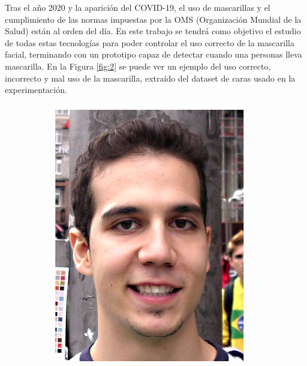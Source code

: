 Tras el año 2020 y la aparición del COVID-19, el uso de mascarillas y el cumplimiento de las normas impuestas por la OMS (Organización Mundial de la Salud) están al orden del día. En este trabajo se tendrá como objetivo el estudio de todas estas tecnologías para poder controlar el uso correcto de la mascarilla facial, terminando con un prototipo capaz de detectar cuando una personas lleva mascarilla. En la Figura \ref{fig:2} se puede ver un ejemplo del uso correcto, incorrecto y mal uso de la mascarilla, extraído del dataset de caras usado en la experimentación.

\begin{figure}[htp]
	\centering
	\begin{subfigure}{0.2\linewidth}
		\includegraphics[width=\linewidth]{imagenes/dataset2-1.jpg} 
		\caption{}
		\label{fig:2a}
	\end{subfigure}\hfill
	\begin{subfigure}{0.4\linewidth}

\end{subfigure}
\end{figure}
